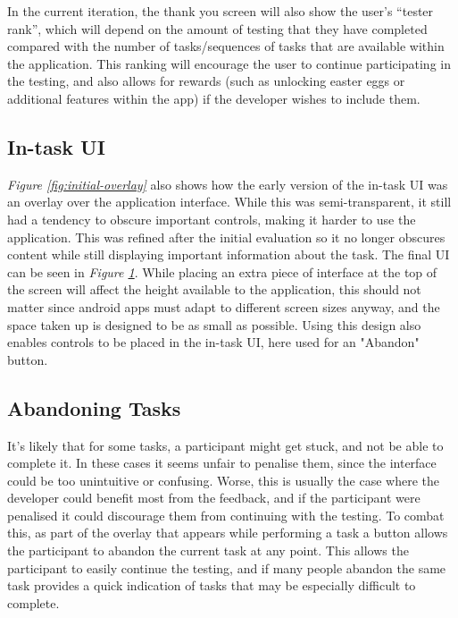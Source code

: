 In the current iteration, the thank you screen will also show the user's
``tester rank'', which will depend on the amount of testing that they have
completed compared with the number of tasks/sequences of tasks that are
available within the application. This ranking will encourage the user to
continue participating in the testing, and also allows for rewards (such as
unlocking easter eggs or additional features within the app) if the developer
wishes to include them.

\subsection{In-task UI}

\emph{Figure \ref{fig:initial-overlay}} also shows how the early version of the in-task UI was an overlay over the application interface. While this was semi-transparent, it still had a tendency to obscure important controls, making it harder to use the application. This was refined after the initial evaluation so it no longer obscures content while still displaying important information about the task. The final UI can be seen in \emph{Figure \ref{fig:final-task-overlay}}. While placing an extra piece of interface at the top of the screen will affect the height available to the application, this should not matter since android apps must adapt to different screen sizes anyway, and the space taken up is designed to be as small as possible. Using this design also enables controls to be placed in the in-task UI, here used for an "Abandon" button.

\begin{figure}
  \label{fig:final-task-overlay}
\end{figure}

\subsection{Abandoning Tasks}

It's likely that for some tasks, a participant might get stuck, and not be able
to complete it. In these cases it seems unfair to penalise them, since the
interface could be too unintuitive or confusing. Worse, this is usually the case
where the developer could benefit most from the feedback, and if the participant
were penalised it could discourage them from continuing with the testing. To
combat this, as part of the overlay that appears while performing a task a
button allows the participant to abandon the current task at any point. This allows the participant to easily continue the testing, and if many people abandon the same task provides a quick indication of tasks that may be especially difficult to complete.

